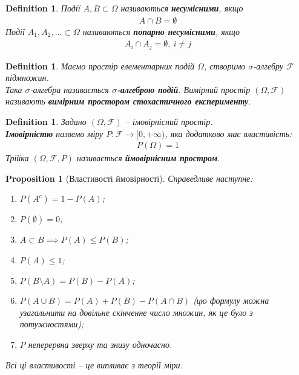 \documentclass[a4paper, 10pt]{article}
\theoremstyle{theoremdd}
\newtheorem{definition}[theorem]{Definition}
\newtheorem{proposition}[theorem]{Proposition}
\begin{document}
\begin{definition}
Події $A,B \subset \Omega$ називаються \textbf{несумісними}, якщо
\begin{align*}
A \cap B = \emptyset
\end{align*}
Події $A_1,A_2,\dots \subset \Omega$ називаються \textbf{попарно несумісними}, якщо
\begin{align*}
A_i \cap A_j = \emptyset,\ i \neq j
\end{align*}
\end{definition}

\begin{definition}
Маємо простір елементарних подій $\Omega$, створимо $\sigma$-алгебру $\mathcal{F}$ підмножин.\\
Така $\sigma$-алгебра називається \textbf{$\sigma$-алгеброю подій}. Вимірний простір $(\Omega,\mathcal{F})$ називають \textbf{вимірним простором стохастичного експерименту}.
\end{definition}

\begin{definition}
Задано $(\Omega,\mathcal{F})$ -- імовірнісний простір.\\
\textbf{Імовірністю} назвемо міру $P \colon \mathcal{F} \to [0,+\infty)$, яка додатково має властивість:
\begin{align*}
P(\Omega) = 1
\end{align*}
Трійка $(\Omega,\mathcal{F},P)$ називається \textbf{ймовірнісним простром}.
\end{definition}

\begin{proposition}[Властивості ймовірності]
Справедливе наступне:
\begin{enumerate}[nosep,wide=0pt,label={\arabic*)}]
\item $P(A^c) = 1 - P(A)$;
\item $P(\emptyset) = 0$;
\item $A \subset B \implies P(A) \leq P(B)$;
\item $P(A) \leq 1$;
\item $P(B \setminus A) = P(B) - P(A)$;
\item $P(A \cup B) = P(A) + P(B) - P(A \cap B)$ (цю формулу можна узагальнити на довільне скінченне число множин, як це було з потужностями);
\item $P$ неперервна зверху та знизу одночасно.
\end{enumerate}
\textit{Всі ці властивості -- це випливає з теорії міри.}
\end{proposition}
\end{document}
